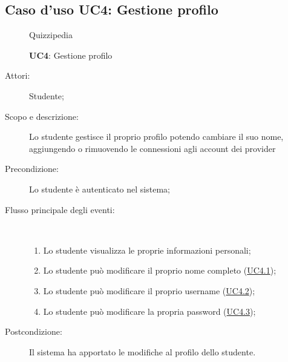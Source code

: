 \subsection{Caso d'uso UC4: Gestione profilo}
\begin{figure}[H]
	\centering
	\begin{resizedtikzpicture}{\textwidth}
		\begin{umlsystem}[x=0, fill=lightgray!20]{Quizzipedia}
		\end{umlsystem}
	\end{resizedtikzpicture}
	\caption{\textbf{UC4}: Gestione profilo}
	\label{UC4}
\end{figure}
\begin{description}
	\item[Attori:] Studente;
	\item[Scopo e descrizione:] Lo studente gestisce il proprio profilo potendo cambiare il suo nome, aggiungendo o rimuovendo le connessioni agli account dei provider 
	\item[Precondizione:] Lo studente è autenticato nel sistema;
	
	\item[Flusso principale degli eventi:] \ 
	\begin{enumerate}
		\item Lo studente visualizza le proprie informazioni personali;
		\item Lo studente può modificare il proprio nome completo (\hyperlink{UC4.1}{UC4.1});
		\item Lo studente può modificare il proprio username	 (\hyperlink{UC4.2}{UC4.2});
		\item Lo studente può modificare la propria password (\hyperlink{UC4.3}{UC4.3});
		
	\end{enumerate}
	\item[Postcondizione:] Il sistema ha apportato le modifiche al profilo dello studente.
\end{description}
\hypertarget{UC4.1}{}
